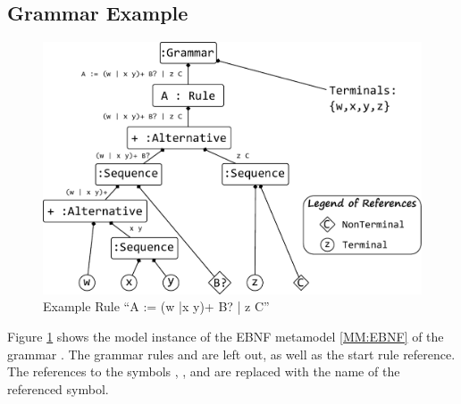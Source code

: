 \subsection{Grammar Example}
\begin{figure}
\centering
\includegraphics[scale=0.7]{gfx/ex/grammarExample} 
\caption{Example Rule ``A := (w |x y)+ B? | z C''}
\label{MM:GrammarExample}
\end{figure}
Figure \ref{MM:GrammarExample} shows the model instance of the EBNF metamodel \ref{MM:EBNF} of the grammar  . The grammar rules  and  are left out, as well as the start rule reference. The references to the symbols , ,  and  are replaced with the name of the referenced symbol.

